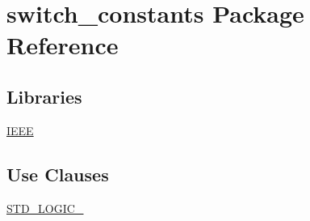 \hypertarget{classswitch__constants}{}\section{switch\+\_\+constants Package Reference}
\label{classswitch__constants}
\subsection*{Libraries}
 \begin{DoxyCompactItemize}
\item 
\mbox{\label{classswitch__constants_ae4f03c286607f3181e16b9aa12d0c6d4}} 
\mbox{\hyperlink{classswitch__constants_ae4f03c286607f3181e16b9aa12d0c6d4}{I\+E\+EE}} 
\end{DoxyCompactItemize}
\subsection*{Use Clauses}
 \begin{DoxyCompactItemize}
\item 
\mbox{\label{classswitch__constants_aa4b2b25246a821511120e3149b003563}} 
\mbox{\hyperlink{classswitch__constants_aa4b2b25246a821511120e3149b003563}{S\+T\+D\+\_\+\+L\+O\+G\+I\+C\+\_}}   
\end{DoxyCompactItemize}
